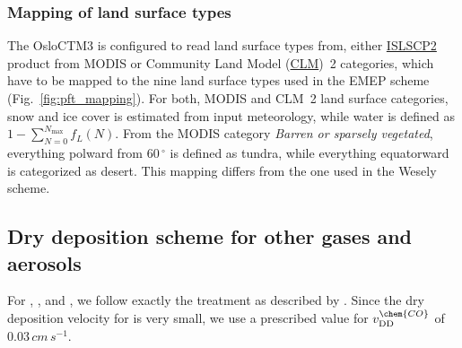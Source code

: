 \documentclass[gmd, manuscript]{copernicus}
\begin{document}
\subsubsection{Mapping of land surface types}
The OsloCTM3 is configured to read land surface types from, either \href{https://daac.ornl.gov/cgi-bin/dataset_lister.pl?p=29}{ISLSCP2} product from MODIS or Community Land Model (\href{http://www.cgd.ucar.edu/tss/clm/}{CLM})~2 categories, which have to be mapped to the nine land surface types used in the EMEP scheme (Fig.~\ref{fig:pft_mapping}). For both, MODIS and CLM~2 land surface categories, snow and ice cover is estimated from input meteorology, while water is defined as $1-\sum_{N=0}^{N_\text{max}} f_L(N)$. From the MODIS category \emph{Barren or sparsely vegetated}, everything polward from $60\,\unit{^\circ}$ is defined as tundra, while everything equatorward is categorized as desert. This mapping differs from the one used in the Wesely scheme.

\subsection{Dry deposition scheme for other gases and aerosols}
For , , and , we follow exactly the treatment as described by \citet{ACP:Simpson2012}. Since the dry deposition velocity for  is very small, we use a prescribed value for $v_\text{DD}^\chem{CO}$ of $0.03\,\unit{cm\,s^{-1}}$.
\end{document}
